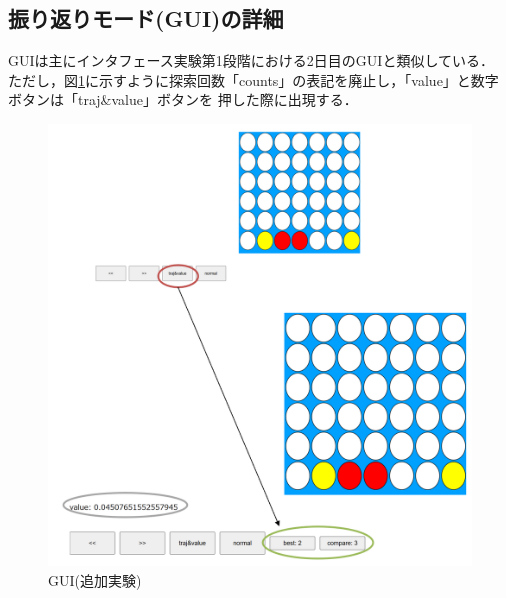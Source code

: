 \subsection{振り返りモード(GUI)の詳細}
GUIは主にインタフェース実験第1段階における2日目のGUIと類似している．
ただし，図\ref{fig:extra}に示すように探索回数「counts」の表記を廃止し，「value」と数字ボタンは「traj\&value」ボタンを
押した際に出現する．
\begin{figure}[htbp]
	\centering
    \includegraphics[width=\linewidth]{./figure/extra.png}
	\caption{GUI(追加実験)}
	\label{fig:extra}
\end{figure}

